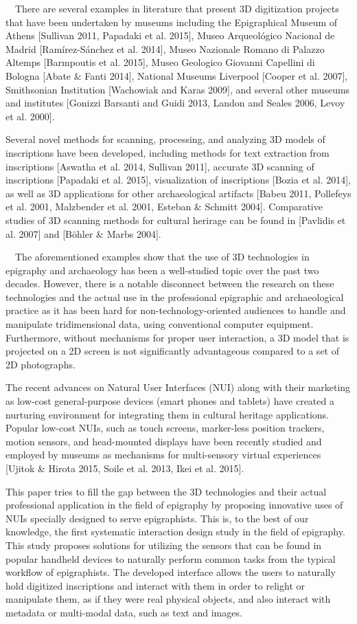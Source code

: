 \documentclass[amsthm,ebook]{saparticle}
\begin{document}
\ \ There are several examples in literature that present 3D digitization projects that have been undertaken by museums
including the Epigraphical Museum of Athens [Sullivan 2011, Papadaki et al. 2015], Museo Arqueológico Nacional de
Madrid [Ramírez-Sánchez et al. 2014], Museo Nazionale Romano di Palazzo Altemps [Barmpoutis et al. 2015], Museo
Geologico Giovanni Capellini di Bologna [Abate \& Fanti 2014], National Museums Liverpool [Cooper et al. 2007],
Smithsonian Institution [Wachowiak and Karas 2009], and several other museums and institutes [Gonizzi Barsanti and
Guidi 2013, Landon and Seales 2006, Levoy et al. 2000].

Several novel methods for scanning, processing, and analyzing 3D models of inscriptions have been developed, including
methods for text extraction from inscriptions [Aswatha et al. 2014, Sullivan 2011], accurate 3D scanning of
inscriptions [Papadaki et al. 2015], visualization of inscriptions [Bozia et al. 2014], as well as 3D applications for
other archaeological artifacts [Babeu 2011, Pollefeys et al. 2001, Malzbender et al. 2001, Esteban \& Schmitt 2004].
Comparative studies of 3D scanning methods for cultural herirage can be found in [Pavlidis et al. 2007] and [Böhler \&
Marbs 2004]. 

\ \ The aforementioned examples show that the use of 3D technologies in epigraphy and archaeology has been a
well-studied topic over the past two decades. However, there is a notable disconnect between the research on these
technologies and the actual use in the professional epigraphic and archaeological practice as it has been hard for
non-technology-oriented audiences to handle and manipulate tridimensional data, using conventional computer equipment.
Furthermore, without mechanisms for proper user interaction, a 3D model that is projected on a 2D screen is not
significantly advantageous compared to a set of 2D photographs. 

The recent advances on Natural User Interfaces (NUI) along with their marketing as low-cost general-purpose devices
(smart phones and tablets) have created a nurturing environment for integrating them in cultural heritage applications.
Popular low-cost NUIs, such as touch screens, marker-less position trackers, motion sensors, and head-mounted displays
have been recently studied and employed by museums as mechanisms for multi-sensory virtual experiences [Ujitok \&
Hirota 2015, Soile et al. 2013, Ikei et al. 2015].

This paper tries to fill the gap between the 3D technologies and their actual professional application in the field of
epigraphy by proposing innovative uses of NUIs specially designed to serve epigraphists. This is, to the best of our
knowledge, the first systematic interaction design study in the field of epigraphy. This study proposes solutions for
utilizing the sensors that can be found in popular handheld devices to naturally perform common tasks from the typical
workflow of epigraphists. The developed interface allows the users to naturally hold digitized inscriptions and
interact with them in order to relight or manipulate them, as if they were real physical objects, and also interact
with metadata or multi-modal data, such as text and images. 
\end{document}
